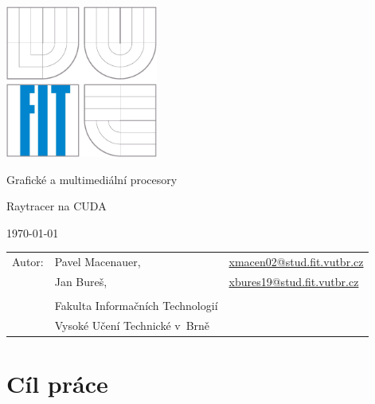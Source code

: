 \documentclass[12pt,a4paper,titlepage,final]{report}
\makeatletter
\newcommand\Course{Grafické a multimediální procesory}
\newcommand\WorkTitle{Raytracer na CUDA}
\newcommand\AuthorA{Pavel Macenauer}
\newcommand\AuthorB{Jan Bureš}
\newcommand\AuthorAEmail{xmacen02@stud.fit.vutbr.cz}
\newcommand\AuthorBEmail{xbures19@stud.fit.vutbr.cz}
\newcommand\Faculty{Fakulta Informačních Technologií}
\newcommand\School{Vysoké Učení Technické v~Brně}
\makeatother
\begin{document}
	\begin{titlepage}
	\begin{center}
		\includegraphics[height=5cm]{images/logo.eps}
	\end{center}
	\vfill
	\begin{center}
		\begin{Large}
			\Course\\
		\end{Large}
		\bigskip
		\begin{Huge}
			\WorkTitle\\
		\end{Huge}
	\end{center}
	\vfill
	\begin{center}
		\begin{large}
			\today
		\end{large}
	\end{center}
	\vfill
	\begin{flushleft}
		\begin{large}
			\begin{tabular}{lll}
				Autor: & \AuthorA, & \url{\AuthorAEmail} \\
				& \AuthorB, & \url{\AuthorBEmail} \\
		
				& & \\
				& \Faculty \\
				& \School \\
			\end{tabular}
		\end{large}
	\end{flushleft}
\end{titlepage}		

\tableofcontents

\newpage

\section{Cíl práce}
\end{document}
